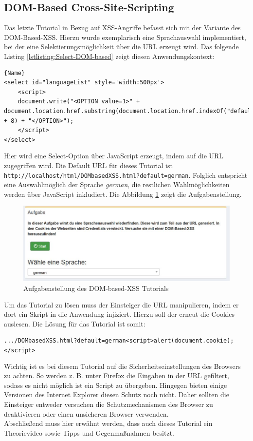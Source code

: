 \subsection{DOM-Based Cross-Site-Scripting}
Das letzte Tutorial in Bezug auf XSS-Angriffe befasst sich mit der Variante des DOM-Based-XSS. Hierzu wurde exemplarisch eine Sprachauswahl implementiert, bei der eine Selektierungsmöglichkeit über die URL erzeugt wird. Das folgende Listing \ref{lstlisting:Select-DOM-based} zeigt diesen Anwendungskontext: 
\begin{lstlisting}[caption=Select-Statement\label{lstlisting:Select-DOM-based}]{Name}
<select id="languageList" style='width:500px'>
	<script>
	document.write("<OPTION value=1>" + 				document.location.href.substring(document.location.href.indexOf("default=") + 8) + "</OPTION>");
	</script>
</select>
\end{lstlisting}
Hier wird eine Select-Option über JavaScript erzeugt, indem auf die URL zugegriffen wird. Die Default URL für dieses Tutorial ist \\ \colorbox{altgray}{\lstinline|http://localhost/html/DOMbasedXSS.html?default=german|}. Folglich entspricht eine Auswahlmöglich der Sprache \textit{german}, die restlichen Wahlmöglichkeiten werden über JavaScript inkludiert. Die Abbildung \ref{fig:dom-based-xss-aufgabe} zeigt die Aufgabenstellung. 
\begin{figure}[H]
	\centering
	\includegraphics[width=\textwidth]{images/XSS/dom-based-xss-aufgabe.jpg}
	\caption{Aufgabenstellung des DOM-based-XSS Tutorials}
	\label{fig:dom-based-xss-aufgabe}
\end{figure}
Um das Tutorial zu lösen muss der Einsteiger die URL manipulieren, indem er dort ein Skript in die Anwendung injiziert. Hierzu soll der erneut die Cookies auslesen. Die Lösung für das Tutorial ist somit: 
\begin{center} 
\colorbox{altgray}{\lstinline|.../DOMbasedXSS.html?default=german<script>alert(document.cookie);</script>|} 
\end{center}
Wichtig ist es bei diesem Tutorial auf die Sicherheitseinstellungen des Browsers zu achten. So werden z. B. unter Firefox die Eingaben in der URL gefiltert, sodass es nicht möglich ist ein Script zu übergeben. Hingegen bieten einige Versionen des Internet Explorer diesen Schutz noch nicht. Daher sollten die Einsteiger entweder versuchen die Schutzmechanismen des Browser zu deaktivieren oder einen unsicheren Browser verwenden. \\ 
Abschließend muss hier erwähnt werden, dass auch dieses Tutorial ein Theorievideo sowie Tipps und Gegenmaßnahmen besitzt. 





